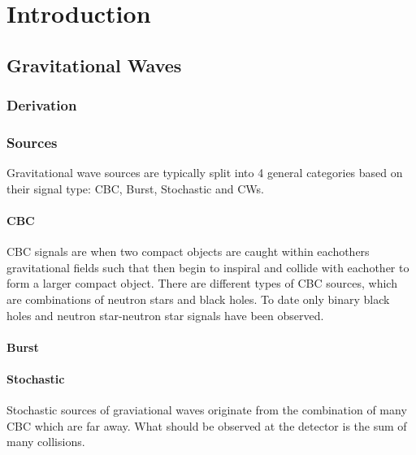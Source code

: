 \chapter{Introduction}


\section{Gravitational Waves}

\subsection{Derivation}

\subsection{\label{sources}Sources}

Gravitational wave sources are typically split into 4 general categories based on their signal type: \ac{CBC}, Burst, Stochastic and \acp{CW}. 

\subsubsection{\label{sources:cbc}CBC}

\ac{CBC} signals are when two compact objects are caught within eachothers gravitational fields such that then begin to inspiral and collide with eachother to form a larger compact object. 
There are different types of \ac{CBC} sources, which are combinations of neutron stars and black holes. To date only binary black holes and neutron star-neutron star signals have been observed. 

\subsubsection{Burst}

\subsubsection{Stochastic}

Stochastic sources of graviational waves originate from the combination of many \ac{CBC} which are far away. What should be observed at the detector is the sum of many collisions. 

